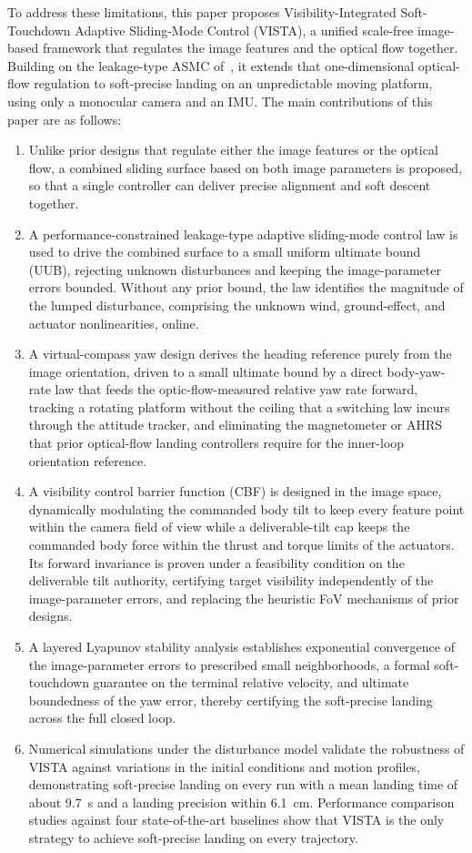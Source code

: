 \documentclass{IEEEtaes}
\theoremstyle{definition}
\theoremstyle{remark}
\begin{document}
To address these limitations, this paper proposes Visibility-Integrated Soft-Touchdown Adaptive Sliding-Mode Control (VISTA), a unified scale-free image-based framework that regulates the image features and the optical flow together. Building on the leakage-type ASMC of~\cite{singhal2025}, it extends that one-dimensional optical-flow regulation to soft-precise landing on an unpredictable moving platform, using only a monocular camera and an IMU. The main contributions of this paper are as follows:
\begin{enumerate}
\item Unlike prior designs that regulate either the image features or the optical flow, a combined sliding surface based on both image parameters is proposed, so that a single controller can deliver precise alignment and soft descent together.
\item A performance-constrained leakage-type adaptive sliding-mode control law is used to drive the combined surface to a small uniform ultimate bound (UUB), rejecting unknown disturbances and keeping the image-parameter errors bounded. Without any prior bound, the law identifies the magnitude of the lumped disturbance, comprising the unknown wind, ground-effect, and actuator nonlinearities, online.
\item A virtual-compass yaw design derives the heading reference purely from the image orientation, driven to a small ultimate bound by a direct body-yaw-rate law that feeds the optic-flow-measured relative yaw rate forward, tracking a rotating platform without the ceiling that a switching law incurs through the attitude tracker, and eliminating the magnetometer or AHRS that prior optical-flow landing controllers require for the inner-loop orientation reference.
\item A visibility control barrier function (CBF) is designed in the image space, dynamically modulating the commanded body tilt to keep every feature point within the camera field of view while a deliverable-tilt cap keeps the commanded body force within the thrust and torque limits of the actuators. Its forward invariance is proven under a feasibility condition on the deliverable tilt authority, certifying target visibility independently of the image-parameter errors, and replacing the heuristic FoV mechanisms of prior designs.
\item A layered Lyapunov stability analysis establishes exponential convergence of the image-parameter errors to prescribed small neighborhoods, a formal soft-touchdown guarantee on the terminal relative velocity, and ultimate boundedness of the yaw error, thereby certifying the soft-precise landing across the full closed loop.
\item Numerical simulations under the disturbance model validate the robustness of VISTA against variations in the initial conditions and motion profiles, demonstrating soft-precise landing on every run with a mean landing time of about 9.7~s and a landing precision within 6.1~cm. Performance comparison studies against four state-of-the-art baselines show that VISTA is the only strategy to achieve soft-precise landing on every trajectory.
\end{enumerate}
\end{document}
